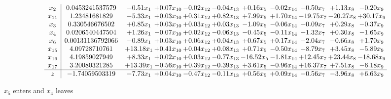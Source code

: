 \documentclass[9pt]{article}
\begin{document}
 \[\begin{array}{c| c c@{\hskip 2pt} c@{\hskip 2pt} c@{\hskip 2pt} c@{\hskip 2pt} c@{\hskip 2pt} c@{\hskip 2pt} c@{\hskip 2pt} c@{\hskip 2pt} c@{\hskip 2pt} }
 x_{2}   &  0.0453241537579 & -0.51 x_{1} & +  0.07 x_{10} & -0.02 x_{12} & -0.04 x_{13} & +  0.16 x_{5} & -0.02 x_{14} & +  0.50 x_{7} & +  1.13 x_{8} & -0.20 x_{9}\\
 x_{11}   &  1.23481681829 & -5.33 x_{1} & +  0.03 x_{10} & +  0.31 x_{12} & +  0.82 x_{13} & +  7.99 x_{5} & +  1.70 x_{14} & -19.75 x_{7} & -20.27 x_{8} & + 30.17 x_{9}\\
 x_{3}   &  0.330546676502 & +  0.85 x_{1} & +  0.03 x_{10} & +  0.03 x_{12} & +  0.03 x_{13} & -1.09 x_{5} & -0.06 x_{14} & +  0.09 x_{7} & +  0.29 x_{8} & -0.37 x_{9}\\
 x_{4}   &  0.0206540447504 & +  1.26 x_{1} & -0.07 x_{10} & +  0.02 x_{12} & -0.06 x_{13} & -0.45 x_{5} & -0.11 x_{14} & +  1.32 x_{7} & +  0.30 x_{8} & -1.65 x_{9}\\
 x_{6}   &  0.00131136792066 & -0.89 x_{1} & +  0.03 x_{10} & +  0.06 x_{12} & +  0.04 x_{13} & +  0.67 x_{5} & +  0.17 x_{14} & -2.04 x_{7} & -0.66 x_{8} & +  1.70 x_{9}\\
 x_{15}   &  4.09728710761 & + 13.18 x_{1} & +  0.41 x_{10} & +  0.04 x_{12} & +  0.08 x_{13} & +  0.71 x_{5} & -0.50 x_{14} & +  8.79 x_{7} & +  3.45 x_{8} & -5.89 x_{9}\\
 x_{16}   &  4.19859027949 & +  8.33 x_{1} & +  0.02 x_{10} & +  0.03 x_{12} & -0.77 x_{13} & -16.52 x_{5} & -1.81 x_{14} & + 12.45 x_{7} & + 23.44 x_{8} & -18.68 x_{9}\\
 x_{17}   &  3.20080321285 & + 13.39 x_{1} & -0.56 x_{10} & +  0.39 x_{12} & -0.39 x_{13} & +  3.61 x_{5} & -0.96 x_{14} & + 16.37 x_{7} & +  7.51 x_{8} & -6.18 x_{9}\\
\hline
z    &  -1.74059503319 & -7.73 x_{1} & +  0.04 x_{10} & -0.47 x_{12} & -0.11 x_{13} & +  0.56 x_{5} & +  0.09 x_{14} & -0.56 x_{7} & -3.96 x_{8} & +  6.63 x_{9}\\
\end{array}\]


 $ x_{5} $ enters and $ x_{4} $ leaves 
\end{document}
